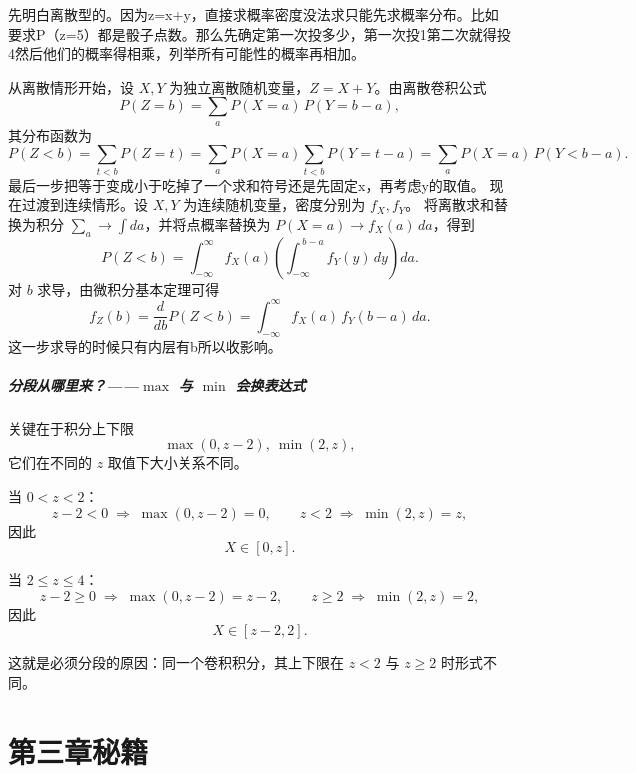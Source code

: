 \begin{dxtips}
先明白离散型的。因为z=x+y，直接求概率密度没法求只能先求概率分布。比如要求P（z=5）都是骰子点数。那么先确定第一次投多少，第一次投1第二次就得投4然后他们的概率得相乘，列举所有可能性的概率再相加。
\end{dxtips}
\begin{note}
    从离散情形开始，设 $X,Y$ 为独立离散随机变量，$Z=X+Y$。由离散卷积公式
\[
P(Z=b)=\sum_a P(X=a)\,P(Y=b-a),
\]
其分布函数为
\[
P(Z<b)=\sum_{t<b}P(Z=t)
      =\sum_a P(X=a)\sum_{t<b}P(Y=t-a)
      =\sum_a P(X=a)\,P(Y<b-a).
\]
最后一步把等于变成小于吃掉了一个求和符号还是先固定x，再考虑y的取值。
现在过渡到连续情形。设 $X,Y$ 为连续随机变量，密度分别为 $f_X,f_Y$。
将离散求和替换为积分 $\sum_a\to\int da$，并将点概率替换为
$P(X=a)\to f_X(a)\,da$，得到
\[
P(Z<b)=\int_{-\infty}^{\infty} f_X(a)
       \left(\int_{-\infty}^{\,b-a} f_Y(y)\,dy\right) da.
\]
对 $b$ 求导，由微积分基本定理可得
\[
f_Z(b)=\frac{d}{db}P(Z<b)
      =\int_{-\infty}^{\infty} f_X(a)\,f_Y(b-a)\,da.
\]
这一步求导的时候只有内层有b所以收影响。
\end{note}
\begin{note}
    \paragraph{分段从哪里来？——$\max$ 与 $\min$ 会换表达式}

关键在于积分上下限
\[
\max(0,z-2),\ \min(2,z),
\]
它们在不同的 $z$ 取值下大小关系不同。

\medskip
\noindent
当 $0<z<2$：
\[
z-2<0 \;\Rightarrow\; \max(0,z-2)=0,\qquad
z<2 \;\Rightarrow\; \min(2,z)=z,
\]
因此
\[
X\in[0,z].
\]

\medskip
\noindent
当 $2\le z\le 4$：
\[
z-2\ge 0 \;\Rightarrow\; \max(0,z-2)=z-2,\qquad
z\ge 2 \;\Rightarrow\; \min(2,z)=2,
\]
因此
\[
X\in[z-2,2].
\]

\medskip
这就是必须分段的原因：同一个卷积积分，其上下限在 $z<2$ 与 $z\ge 2$ 时形式不同。
\end{note}
\chapter{第三章秘籍}
